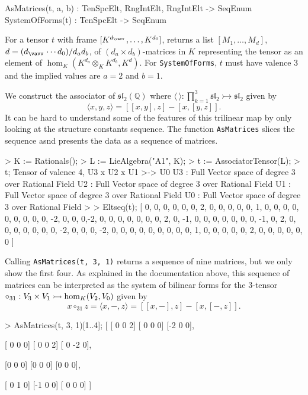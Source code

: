 \begin{intrinsics}
AsMatrices(t, a, b) : TenSpcElt, RngIntElt, RngIntElt -> SeqEnum
SystemOfForms(t) : TenSpcElt -> SeqEnum
\end{intrinsics}

For a tensor $t$ with frame $[K^{d_{\vav}},\dots,K^{d_0}]$, 
returns a list $[M_1,\dots,M_d]$, $d=(d_{\vav}\cdots d_0)/d_a d_b$, 
of $(d_a\times d_b)$-matrices in $K$ representing the tensor
as an element of $\hom_K(K^{d_a}\otimes_K K^{d_b},K^d)$.
For \texttt{SystemOfForms}, $t$ must have valence $3$ and the implied values are $a=2$ and $b=1$.


\begin{example}[TrilinearAsMats]

We construct the associator of $\mathfrak{sl}_2(\mathbb{Q})$ where $\langle \, \rangle : \prod_{k=1}^3\mathfrak{sl}_2\rightarrowtail \mathfrak{sl}_2$ given by
\[ \langle x,y,z \rangle = [[x,y],z] - [x,[y,z]]. \]
It can be hard to understand some of the features of this trilinear map by only looking at the structure constants sequence. 
The function \texttt{AsMatrices} slices the sequence asnd presents the data as a sequence of matrices.
\begin{code}
> K := Rationals();
> L := LieAlgebra("A1", K);
> t := AssociatorTensor(L);
> t;
Tensor of valence 4, U3 x U2 x U1 >-> U0
U3 : Full Vector space of degree 3 over Rational Field
U2 : Full Vector space of degree 3 over Rational Field
U1 : Full Vector space of degree 3 over Rational Field
U0 : Full Vector space of degree 3 over Rational Field
>
> Eltseq(t);
[ 0, 0, 0, 0, 0, 0, 2, 0, 0, 0, 0, 0, 1, 0, 0, 0, 0, 0, 0, 0, 0, 0, -2, 0, 0,
0,-2, 0, 0, 0, 0, 0, 0, 0, 2, 0, -1, 0, 0, 0, 0, 0, 0, 0, -1, 0, 2, 0, 0, 0,
0, 0, 0, 0, -2, 0, 0, 0, -2, 0, 0, 0, 0, 0, 0, 0, 0, 0, 1, 0, 0, 0, 0, 0, 2,
0, 0, 0, 0, 0, 0 ]
\end{code}

Calling \texttt{AsMatrices(t, 3, 1)} returns a sequence of nine matrices, but we only show the first four.
As explained in the documentation above, this sequence of matrices can be interpreted as the system of bilinear forms for the 3-tensor $\circ_{31} : V_3 \times V_1 \rightarrowtail \operatorname{hom}_K(V_2,V_0)$ given by
\[ x\circ_{31} z = \langle x, -,z \rangle = [[x,-],z] - [x,[-,z]].\]

\begin{code}
> AsMatrices(t, 3, 1)[1..4];
[
    [ 0  0  2]
    [ 0  0  0]
    [-2  0  0],

    [ 0  0  0]
    [ 0  0  2]
    [ 0 -2  0],

    [0 0 0]
    [0 0 0]
    [0 0 0],

    [ 0  1  0]
    [-1  0  0]
    [ 0  0  0]
]
\end{code}
\end{example}



